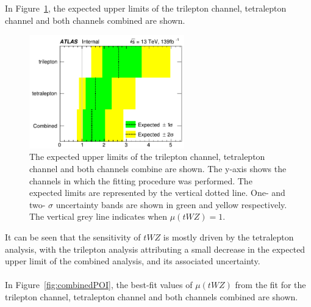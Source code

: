 In Figure~\ref{fig:combinedlimits}, the expected upper limits of the trilepton channel, tetralepton channel and both channels combined are shown.
\begin{figure}
    \centering
    \includegraphics[width=0.6\textwidth]{figures/combined/Limits.png}
    \caption{The expected upper limits of the trilepton channel, tetralepton channel and both channels combine are shown. The y-axis shows the channels in which the fitting procedure was performed. The expected limits are represented by the vertical dotted line. One- and two- $\sigma$ uncertainty bands are shown in green and yellow respectively. The vertical grey line indicates when $\mu (tWZ) = 1$. }
    \label{fig:combinedlimits}
\end{figure}

It can be seen that the sensitivity of $tWZ$ is mostly driven by the tetralepton analysis, with the trilepton analysis attributing a small decrease in the expected upper limit of the combined analysis, and its associated uncertainty. \\\\

In Figure~\ref{fig:combinedPOI}, the best-fit values of $\mu (tWZ)$ from the fit for the trilepton channel, tetralepton channel and both channels combined are shown.


